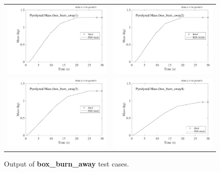 \documentclass[11pt]{book}
\begin{document}
\begin{figure}[ht]
\begin{tabular*}{\textwidth}{lr}
\includegraphics[width=3.2in]{SCRIPT_FIGURES/box_burn_away1} &
\includegraphics[width=3.2in]{SCRIPT_FIGURES/box_burn_away2} \\
\includegraphics[width=3.2in]{SCRIPT_FIGURES/box_burn_away3} &
\includegraphics[width=3.2in]{SCRIPT_FIGURES/box_burn_away4}
\end{tabular*}
\caption[Output of {\bf box\_burn\_away} test cases.]{Output of {\bf box\_burn\_away} test cases.}
\label{box_burn_away}
\end{figure}
\end{document}
